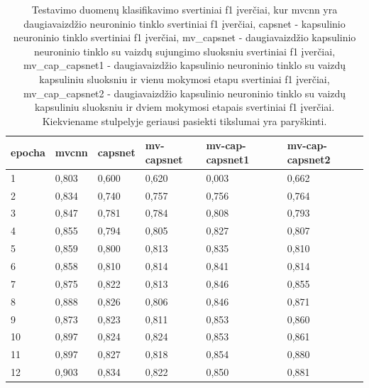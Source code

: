 \begin{table}[]
	\caption{
		Testavimo duomenų klasifikavimo svertiniai f1 įverčiai, kur mvcnn yra daugiavaizdžio neuroninio tinklo svertiniai f1 įverčiai, capsnet - kapsulinio neuroninio tinklo svertiniai f1 įverčiai, mv\_capsnet - daugiavaizdžio kapsulinio neuroninio tinklo su vaizdų sujungimo sluoksniu svertiniai f1 įverčiai, mv\_cap\_capsnet1 - daugiavaizdžio kapsulinio neuroninio tinklo su vaizdų kapsuliniu sluoksniu ir vienu mokymosi etapu svertiniai f1 įverčiai, mv\_cap\_capsnet2 - daugiavaizdžio kapsulinio neuroninio tinklo su vaizdų kapsuliniu sluoksniu ir dviem mokymosi etapais svertiniai f1 įverčiai. Kiekviename stulpelyje geriausi pasiekti tikslumai yra paryškinti.
	}
	\begin{tabular}{l|l|l|l|l|l}
		epocha & mvcnn & capsnet & mv-capsnet & mv-cap-capsnet1 & mv-cap-capsnet2 \\
		\hline
		1 & 0,803 &   0,600 &      0,620 &           0,003 &           0,662 \\
		2 & 0,834 &   0,740 &      0,757 &           0,756 &           0,764 \\
		3 & 0,847 &   0,781 &      0,784 &           0,808 &           0,793 \\
		4 & 0,855 &   0,794 &      0,805 &           0,827 &           0,807 \\
		5 & 0,859 &   0,800 &      0,813 &           0,835 &           0,810 \\
		6 & 0,858 &   0,810 &      0,814 &           0,841 &           0,814 \\
		7 & 0,875 &   0,822 &      0,813 &           0,846 &           0,855 \\
		8 & 0,888 &   0,826 &      0,806 &           0,846 &           0,871 \\
		9 & 0,873 &   0,823 &      0,811 &           0,853 &           0,860 \\
		10 & 0,897 &   0,824 &      0,824 &           0,853 &           0,861 \\
		11 & 0,897 &   0,827 &      0,818 &           0,854 &           0,880 \\
		12 & 0,903 &   0,834 &      0,822 &           0,850 &           0,881 \\
	\end{tabular}
	\label{tbl:weighted_f1}
\end{table}

